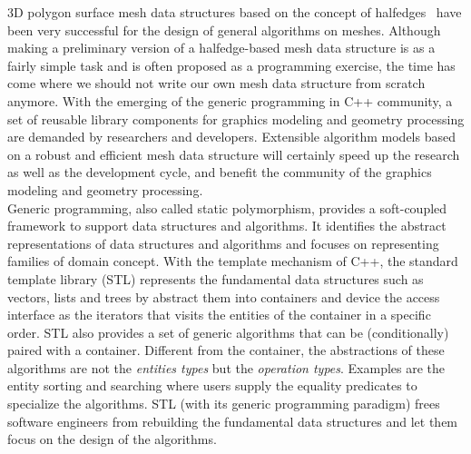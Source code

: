 3D polygon surface mesh data structures based on the concept of
halfedges~\cite{k-ugpdd-99} have been very successful for the design
of general algorithms on meshes.  Although making a preliminary
version of a halfedge-based mesh data structure is as a fairly simple
task and is often proposed as a programming exercise, the time has
come where we should not write our own mesh data structure from
scratch anymore. With the emerging of the generic programming in C++
community, a set of reusable library components for graphics modeling
and geometry processing are demanded by researchers and
developers. Extensible algorithm models based on a robust and
efficient mesh data structure will certainly speed up the research as
well as the development cycle, and benefit the community of the
graphics modeling and geometry processing.\\

Generic programming, also called static polymorphism, provides a
soft-coupled framework to support data structures and algorithms. It
identifies the abstract representations of data structures and
algorithms and focuses on representing families of domain concept.
With the template mechanism of C++, the standard template library
\cite{ms-stl-96} (STL) represents the fundamental data structures such
as vectors, lists and trees by abstract them into containers and
device the access interface as the iterators that visits the entities
of the container in a specific order. STL also provides a set of
generic algorithms that can be (conditionally) paired with a
container.  Different from the container, the abstractions of these
algorithms are not the \emph{entities types} but the \emph{operation
types}.  Examples are the entity sorting and searching where users
supply the equality predicates to specialize the algorithms.  STL
(with its generic programming paradigm) frees software engineers from
rebuilding the fundamental data structures and let them focus on the
design of the algorithms.\\

